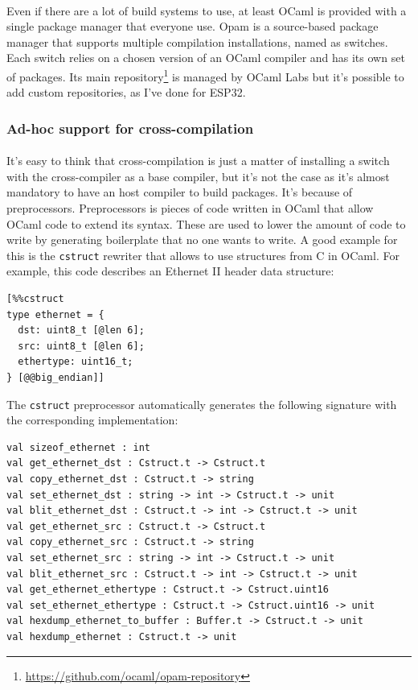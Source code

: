 \documentclass[a4paper]{article}
\begin{document}
\paragraph{}
Even if there are a lot of build systems to use, at least OCaml is provided with a single package manager that everyone use. Opam is a source-based package manager that supports multiple compilation installations, named as switches. Each switch relies on a chosen version of an OCaml compiler and has its own set of packages. Its main repository\footnote{\url{https://github.com/ocaml/opam-repository}} is managed by OCaml Labs but it's possible to add custom repositories, as I've done for ESP32.

\subsubsection{Ad-hoc support for cross-compilation}
\paragraph{}
It's easy to think that cross-compilation is just a matter of installing a switch with the cross-compiler as a base compiler, but it's not the case as it's almost mandatory to have an host compiler to build packages. It's because of preprocessors. Preprocessors is pieces of code written in OCaml that allow OCaml code to extend its syntax. These are used to lower the amount of code to write by generating boilerplate that no one wants to write. A good example for this is the \texttt{cstruct} rewriter that allows to use structures from C in OCaml. 
For example, this code describes an Ethernet II header data structure:
\begin{verbatim}
[%%cstruct
type ethernet = {
  dst: uint8_t [@len 6];
  src: uint8_t [@len 6];
  ethertype: uint16_t;
} [@@big_endian]]
\end{verbatim}
The \texttt{cstruct} preprocessor automatically generates the following signature with the corresponding implementation:
\begin{verbatim}
val sizeof_ethernet : int
val get_ethernet_dst : Cstruct.t -> Cstruct.t
val copy_ethernet_dst : Cstruct.t -> string
val set_ethernet_dst : string -> int -> Cstruct.t -> unit
val blit_ethernet_dst : Cstruct.t -> int -> Cstruct.t -> unit
val get_ethernet_src : Cstruct.t -> Cstruct.t
val copy_ethernet_src : Cstruct.t -> string
val set_ethernet_src : string -> int -> Cstruct.t -> unit
val blit_ethernet_src : Cstruct.t -> int -> Cstruct.t -> unit
val get_ethernet_ethertype : Cstruct.t -> Cstruct.uint16
val set_ethernet_ethertype : Cstruct.t -> Cstruct.uint16 -> unit
val hexdump_ethernet_to_buffer : Buffer.t -> Cstruct.t -> unit
val hexdump_ethernet : Cstruct.t -> unit
\end{verbatim}
\end{document}
